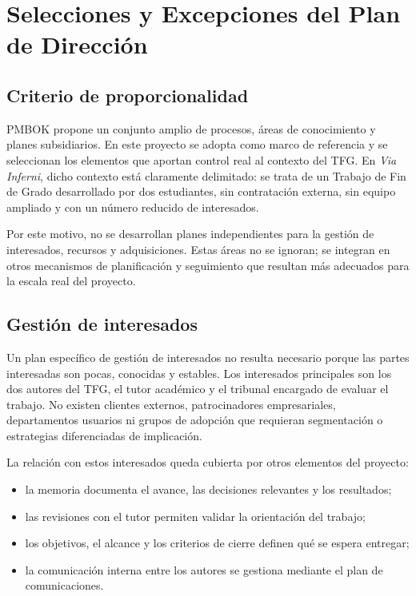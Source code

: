 \chapter{Selecciones y Excepciones del Plan de Dirección}

\begin{abstract}
Este capítulo justifica las áreas de gestión que no se desarrollan como planes
independientes dentro del proyecto. La decisión se basa en el principio de proporcionalidad:
el Plan de Dirección debe aportar control efectivo al proyecto, evitando documentación
adicional que no tenga impacto práctico sobre su ejecución.
\end{abstract}

\section{Criterio de proporcionalidad}
PMBOK \cite{pmbok2021} propone un conjunto amplio de procesos, áreas de conocimiento y
planes subsidiarios. En este proyecto se adopta como marco de referencia y se seleccionan
los elementos que aportan control real al contexto del TFG. En
\textit{Via Inferni}, dicho contexto está claramente delimitado: se trata de un Trabajo de
Fin de Grado desarrollado por dos estudiantes, sin contratación externa, sin equipo ampliado
y con un número reducido de interesados.

Por este motivo, no se desarrollan planes independientes para la gestión de interesados,
recursos y adquisiciones. Estas áreas no se ignoran; se integran en otros mecanismos de
planificación y seguimiento que resultan más adecuados para la escala real del proyecto.

\section{Gestión de interesados}
Un plan específico de gestión de interesados no resulta necesario porque las partes
interesadas son pocas, conocidas y estables. Los interesados principales son los dos autores
del TFG, el tutor académico y el tribunal encargado de evaluar el trabajo. No existen
clientes externos, patrocinadores empresariales, departamentos usuarios ni grupos de
adopción que requieran segmentación o estrategias diferenciadas de implicación.

La relación con estos interesados queda cubierta por otros elementos del proyecto:

\begin{itemize}
    \item la memoria documenta el avance, las decisiones relevantes y los resultados;
    \item las revisiones con el tutor permiten validar la orientación del trabajo;
    \item los objetivos, el alcance y los criterios de cierre definen qué se espera entregar;
    \item la comunicación interna entre los autores se gestiona mediante el plan de
    comunicaciones.
\end{itemize}

